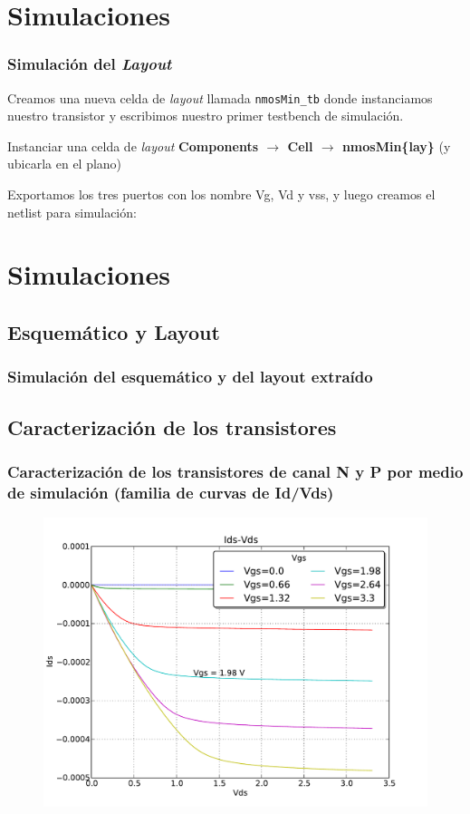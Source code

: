 \documentclass{beamer}
\begin{document}
\section{Simulaciones}
\begin{frame}[fragile]
  \frametitle{Simulación del \emph{Layout}}
  Creamos una nueva celda de \emph{layout} llamada \verb.nmosMin_tb. donde instanciamos nuestro transistor y escribimos nuestro primer testbench de simulación.
  \begin{exampleblock}{Instanciar una celda de \emph{layout}}
\textbf{
Components $\rightarrow$ Cell $\rightarrow$ nmosMin\{lay\}} (y ubicarla en el plano)
  \end{exampleblock}

  Exportamos los tres puertos con los nombre Vg, Vd y vss, y luego creamos el netlist para simulación:

\end{frame}
\section{Simulaciones}
\subsection{Esquemático y Layout}
\begin{frame}
\frametitle{Simulación del esquemático y del layout extraído}
\end{frame}
\subsection{Caracterización de los transistores}
\begin{frame}
  \frametitle{Caracterización de los transistores de canal N y P por medio de simulación (familia de curvas de Id/Vds)}
  \begin{figure}
  \includegraphics[width=0.95\linewidth]{figuras/nmosMin-IDS-VDS.pdf}
  \end{figure}

\end{frame}
\end{document}
